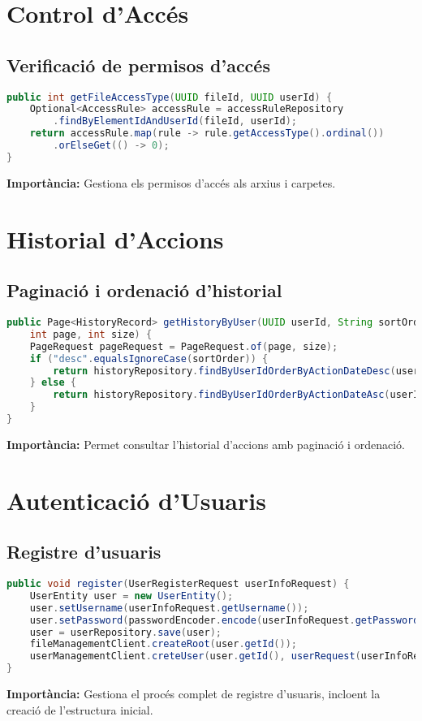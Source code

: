 \section{Control d'Accés}

\subsection{Verificació de permisos d'accés}
\begin{lstlisting}[language=Java]
public int getFileAccessType(UUID fileId, UUID userId) {
    Optional<AccessRule> accessRule = accessRuleRepository
        .findByElementIdAndUserId(fileId, userId);
    return accessRule.map(rule -> rule.getAccessType().ordinal())
        .orElseGet(() -> 0);
}
\end{lstlisting}
\textbf{Importància:} Gestiona els permisos d'accés als arxius i carpetes.

\section{Historial d'Accions}

\subsection{Paginació i ordenació d'historial}
\begin{lstlisting}[language=Java]
public Page<HistoryRecord> getHistoryByUser(UUID userId, String sortOrder, 
    int page, int size) {
    PageRequest pageRequest = PageRequest.of(page, size);
    if ("desc".equalsIgnoreCase(sortOrder)) {
        return historyRepository.findByUserIdOrderByActionDateDesc(userId, pageRequest);
    } else {
        return historyRepository.findByUserIdOrderByActionDateAsc(userId, pageRequest);
    }
}
\end{lstlisting}
\textbf{Importància:} Permet consultar l'historial d'accions amb paginació i ordenació.

\section{Autenticació d'Usuaris}

\subsection{Registre d'usuaris}
\begin{lstlisting}[language=Java]
public void register(UserRegisterRequest userInfoRequest) {
    UserEntity user = new UserEntity();
    user.setUsername(userInfoRequest.getUsername());
    user.setPassword(passwordEncoder.encode(userInfoRequest.getPassword()));
    user = userRepository.save(user);
    fileManagementClient.createRoot(user.getId());
    userManagementClient.creteUser(user.getId(), userRequest(userInfoRequest));
}
\end{lstlisting}
\textbf{Importància:} Gestiona el procés complet de registre d'usuaris, incloent la creació de l'estructura inicial. 